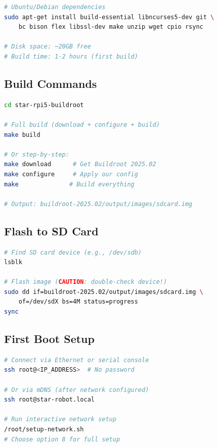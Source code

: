 \begin{lstlisting}[language=bash]
# Ubuntu/Debian dependencies
sudo apt-get install build-essential libncurses5-dev git \
    bc bison flex libssl-dev make unzip wget cpio rsync

# Disk space: ~20GB free
# Build time: 1-2 hours (first build)
\end{lstlisting}

\subsection{Build Commands}

\begin{lstlisting}[language=bash]
cd star-rpi5-buildroot

# Full build (download + configure + build)
make build

# Or step-by-step:
make download      # Get Buildroot 2025.02
make configure     # Apply our config
make              # Build everything

# Output: buildroot-2025.02/output/images/sdcard.img
\end{lstlisting}

\subsection{Flash to SD Card}

\begin{lstlisting}[language=bash]
# Find SD card device (e.g., /dev/sdb)
lsblk

# Flash image (CAUTION: double-check device!)
sudo dd if=buildroot-2025.02/output/images/sdcard.img \
    of=/dev/sdX bs=4M status=progress
sync
\end{lstlisting}

\subsection{First Boot Setup}

\begin{lstlisting}[language=bash]
# Connect via Ethernet or serial console
ssh root@<IP_ADDRESS>  # No password

# Or via mDNS (after network configured)
ssh root@star-robot.local

# Run interactive network setup
/root/setup-network.sh
# Choose option 8 for full setup
\end{lstlisting}

